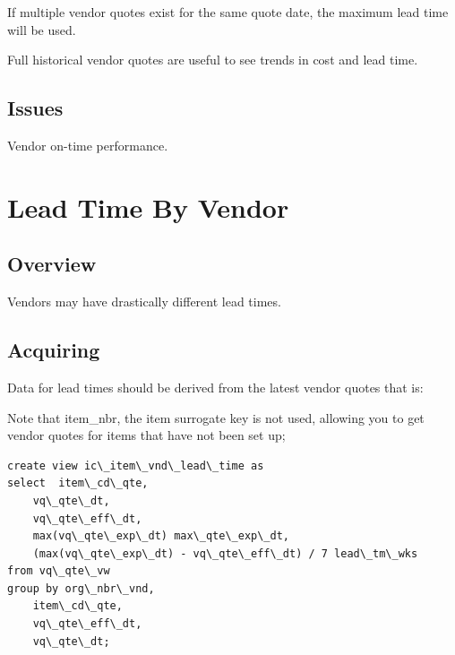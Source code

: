 \documentclass[letterpaper,10pt,english]{sphinxmanual}
\begin{document}
If multiple vendor quotes exist for the same quote date, the maximum
lead time will be used.

Full historical vendor quotes are useful to see trends in cost and lead
time.


\section{Issues}
\label{Portal/400-MultipleLeadTimes:issues}
Vendor on-time performance.


\chapter{Lead Time By Vendor}
\label{Portal/450-MultipleLeadTimes2:lead-time-by-vendor}\label{Portal/450-MultipleLeadTimes2::doc}

\section{Overview}
\label{Portal/450-MultipleLeadTimes2:overview}
Vendors may have drastically different lead times.


\section{Acquiring}
\label{Portal/450-MultipleLeadTimes2:acquiring}
Data for lead times should be derived from the latest vendor quotes that is:

Note that item\_nbr, the item surrogate key is not used, allowing you to
get vendor quotes for items that have not been set up;
\begin{Verbatim}[commandchars=\\\{\}]
create view ic\_item\_vnd\_lead\_time as
select  item\_cd\_qte,
    vq\_qte\_dt,
    vq\_qte\_eff\_dt,
    max(vq\_qte\_exp\_dt) max\_qte\_exp\_dt,
    (max(vq\_qte\_exp\_dt) - vq\_qte\_eff\_dt) / 7 lead\_tm\_wks
from vq\_qte\_vw
group by org\_nbr\_vnd,
    item\_cd\_qte,
    vq\_qte\_eff\_dt,
    vq\_qte\_dt;
\end{Verbatim}
\end{document}
